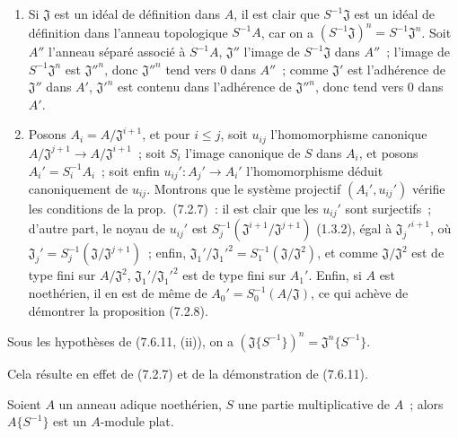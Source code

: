\begin{enumerate}
  \item[\rm(i)] Si $\mathfrak J$ est un idéal de définition dans $A$, il est
    clair que $S^{-1}\mathfrak J$ est un idéal de définition dans l'anneau
    topologique $S^{-1}A$, car on a
    $(S^{-1}\mathfrak J)^n=S^{-1}\mathfrak J^n$. Soit $A''$ l'anneau séparé
    associé à $S^{-1}A$, $\mathfrak J''$ l'image de $S^{-1}\mathfrak J$ dans
    $A''$~; l'image de $S^{-1}\mathfrak J^n$ est $\mathfrak J''^n$, donc
    $\mathfrak J''^n$ tend vers 0 dans $A''$~; comme $\mathfrak J'$ est
    l'adhérence de $\mathfrak J''$ dans $A'$, $\mathfrak J'^n$ est contenu
    dans l'adhérence de $\mathfrak J''^n$, donc tend vers 0 dans $A'$.
  \item[\rm(ii)] Posons $A_i=A/\mathfrak J^{i+1}$, et pour $i\leq j$, soit
    $u_{ij}$ l'homomorphisme canonique
    $A/\mathfrak J^{j+1}\to A/\mathfrak J^{i+1}$~; soit $S_i$ l'image
    canonique de $S$ dans $A_i$, et posons $A_i'=S_i^{-1}A_i$~; soit enfin
    $u_{ij}':A_j'\to A_i'$ l'homomorphisme déduit canoniquement de $u_{ij}$.
    Montrons que le système projectif $(A_i',u_{ij}')$ vérifie les conditions
    de la prop.~(7.2.7)~: il est clair que les $u_{ij}'$ sont surjectifs~;
    d'autre part, le noyau de $u_{ij}'$ est
    $S_j^{-1}(\mathfrak J^{i+1}/\mathfrak J^{j+1})$ (1.3.2), égal à
    $\mathfrak J_j'^{i+1}$, où
    $\mathfrak J_j'=S_j^{-1}(\mathfrak J/\mathfrak J^{j+1})$~; enfin,
    $\mathfrak J_1'/\mathfrak J_1'^2=S_1^{-1}(\mathfrak J/\mathfrak J^2)$,
    et comme $\mathfrak J/\mathfrak J^2$ est de type fini sur
    $A/\mathfrak J^2$, $\mathfrak J_1'/\mathfrak J_1'^2$ est de type fini
    sur $A_1'$. Enfin, si $A$ est noethérien, il en est de même de
    $A_0'=S_0^{-1}(A/\mathfrak J)$, ce qui achève de démontrer la proposition
    (7.2.8).
\end{enumerate}

\begin{corollary}[7.6.12]
\label{0.7.6.12-fr}
Sous les hypothèses de \textup{(7.6.11, (ii))}, on a
$(\mathfrak J\{S^{-1}\})^n=\mathfrak J^n\{S^{-1}\}$.
\end{corollary}

Cela résulte en effet de (7.2.7) et de la démonstration de (7.6.11).

\begin{proposition}[7.6.13]
\label{0.7.6.13-fr}
Soient $A$ un anneau adique noethérien, $S$ une partie multiplicative de $A$~;
alors $A\{S^{-1}\}$ est un $A$-module plat.
\end{proposition}

